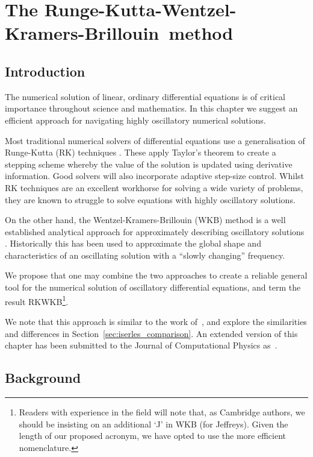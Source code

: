 \chapter[The RKWKB method]{The Runge-Kutta-Wentzel-Kramers-Brillouin~method}
\label{chp:RK}

\section{Introduction}
\label{sec:introduction}
The numerical solution of linear, ordinary differential equations is of critical importance throughout science and mathematics. In this chapter we suggest an efficient approach for navigating highly oscillatory numerical solutions.

Most traditional numerical solvers of differential equations use a generalisation of Runge-Kutta (RK) techniques \citep{Press+2007}. These apply Taylor's theorem to create a stepping scheme whereby the value of the solution is updated using derivative information. Good solvers will also incorporate adaptive step-size control.
Whilst RK techniques are an excellent workhorse for solving a wide variety of problems, they are known to struggle to solve equations with highly oscillatory solutions.

On the other hand, the Wentzel-Kramers-Brillouin (WKB) method is a well established analytical approach for approximately describing oscillatory solutions \citep{RHB,Bender+2010}. Historically this has been used to approximate the global shape and characteristics of an oscillating solution with a ``slowly changing'' frequency.

We propose that one may combine the two approaches to create a reliable general tool for the numerical solution of oscillatory differential equations, and term the result RKWKB\footnote{Readers with experience in the field will note that, as Cambridge authors, we should be insisting on an additional `J' in WKB (for Jeffreys). Given the length of our proposed acronym, we have opted to use the more efficient nomenclature.}.

We note that this approach is similar to the work of~\cite{Iserles02globalerror,Iserles01thinkglobally}, and explore the similarities and differences in Section~\ref{sec:iserles_comparison}. An extended version of this chapter has been submitted to the Journal of Computational Physics as~\cite{RKWKB}.


\section{Background}
